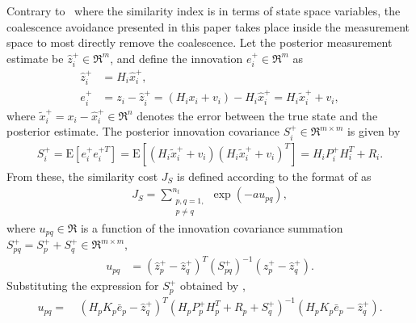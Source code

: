 Contrary to~\cite{KauLovLee14} where the similarity index is in terms of state space variables, the coalescence avoidance presented in this paper takes place inside the measurement space to most directly remove the coalescence.
Let the posterior measurement estimate be $\hat z_i^+\in\Re^m$, and define the innovation $e_{i}^+\in\Re^m$ as
\begin{align}
\hat z_i^+&=H_i\hat x_i^+,
\\
e_{i}^+&=z_i-\hat z_i^+=(H_ix_i+v_i)-H_i\hat x_{i}^+=H_i\tilde x_i^++v_i,
\end{align}
where $\tilde x_i^+=x_i-\hat x_{i}^+\in\Re^n$ denotes the error between the true state and the posterior estimate. The posterior innovation covariance $S^+_i\in\Re^{m\times m}$ is given by
\begin{align}
S^+_i=\mathrm{E}[e_i^+e_i^{+T}]=\mathrm{E}[(H_i\tilde x_i^++v_i)(H_i\tilde x_i^++v_i)^T]
=H_iP^+_iH_i^T+R_i.\label{eqn:Spi}
\end{align}
From these, the similarity cost $J_S$ is defined according to the format of  as
\begin{align}
\label{eqn:Js}
J_S=\sum\limits_{\substack{p,q=1,\\p\neq q}}^{n_t}\exp (-au_{pq}),
\end{align}
where $u_{pq}\in\Re$ is a function of the innovation covariance summation $S^+_{pq}=S^+_{p}+S^+_{q}\in\Re^{m\times m}$,
\begin{align}
u_{pq} & = (\hat z_{p}^+-\hat z^+_{q})^T(S^+_{pq})^{-1}(\hat z^+_{p}-\hat z^+_{q})\label{eqn:U}.
\end{align}
Substituting the expression for $S_p^+$ obtained by ,
\begin{align}
u_{pq}=&\ 
(H_pK_p{\bar{e}}_p-\hat z^+_{q})^T
(H_pP^+_{p}H_p^T+R_p+S^+_q)^{-1}
(H_pK_p{\bar{e}}_p-\hat z^+_{q}).
\label{eqn:Up}
\end{align}

